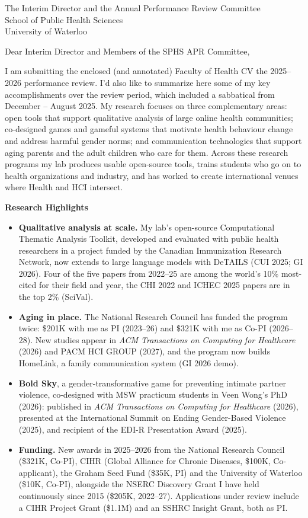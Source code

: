 \documentclass[12pt]{letter}
\date{}
\begin{document}
\begin{letter}{%
The Interim Director and the Annual Performance Review Committee\\
School of Public Health Sciences\\
University of Waterloo}
\opening{Dear Interim Director and Members of the SPHS APR Committee,}

I am submitting the enclosed (and annotated) Faculty of Health CV the 2025--2026 performance review. I'd also like to summarize here some of my key accomplishments over the review period, which included a sabbatical from December -- August 2025. My research focuses on three complementary areas: open tools that support qualitative analysis of large online health communities; co-designed games and gameful systems that motivate health behaviour change and address harmful gender norms; and communication technologies that support aging parents and the adult children who care for them. Across these research programs my lab produces usable open-source tools, trains students who go on to health organizations and industry, and has worked to create international venues where Health and HCI intersect.

\textbf{Research Highlights}
\begin{itemize}
    \item \textbf{Qualitative analysis at scale.} My lab's open-source Computational Thematic Analysis Toolkit, developed and evaluated with public health researchers in a project funded by the Canadian Immunization Research Network, now extends to large language models with DeTAILS (CUI 2025; GI 2026). Four of the five papers from 2022--25 are among the world's 10\% most-cited for their field and year, the CHI 2022 and ICHEC 2025 papers are in the top 2\% (SciVal).
    \item \textbf{Aging in place.} The National Research Council has funded the program twice: \$201K with me as PI (2023--26) and \$321K with me as Co-PI (2026--28). New studies appear in \emph{ACM Transactions on Computing for Healthcare} (2026) and PACM HCI GROUP (2027), and the program now builds HomeLink, a family communication system (GI 2026 demo).
    \item \textbf{Bold Sky}, a gender-transformative game for preventing intimate partner violence, co-designed with MSW practicum students in Veen Wong's PhD (2026): published in \emph{ACM Transactions on Computing for Healthcare} (2026), presented at the International Summit on Ending Gender-Based Violence (2025), and recipient of the EDI-R Presentation Award (2025).
    \item \textbf{Funding.} New awards in 2025--2026 from the National Research Council (\$321K, Co-PI), CIHR (Global Alliance for Chronic Diseases, \$100K, Co-applicant), the Graham Seed Fund (\$35K, PI) and the University of Waterloo (\$10K, Co-PI), alongside the NSERC Discovery Grant I have held continuously since 2015 (\$205K, 2022--27). Applications under review include a CIHR Project Grant (\$1.1M) and an SSHRC Insight Grant, both as PI.
\end{itemize}


\end{letter}
\end{document}
